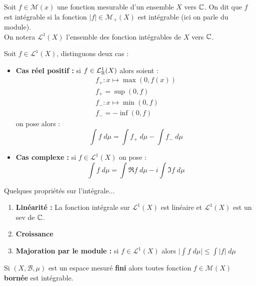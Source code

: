 \begin{definition}
    Soit $f \in \mathcal{M}(x)$ une fonction mesurable d'un ensemble $X$ vers $\mathbb{C}$. 
    On dit que $f$ est intégrable si la fonction $|f| \in \mathcal{M}_+(X)$ est intégrable (ici on parle du module). \\
    On notera $\mathcal{L}^1(X)$ l'ensemble des fonction intégrables de $X$ vers $\mathbb{C}$.
\end{definition}

\newpage
\begin{definition}
    Soit $f \in \mathcal{L}^1(X)$, distinguons deux cas :
    \begin{itemize}
        \item \textbf{Cas réel positif :} si $f \in \mathcal{L}^1_{\mathbb{R}}(X)$ alors soient :
            \begin{align*}
                f_+ : x \longmapsto \max (0, f(x)) \\ 
                f_+ = \sup (0, f) \\ 
                f_- : x \longmapsto \min (0, f) \\
                f_- = - \inf (0, f)
            \end{align*}
            on pose alors :
                \[ \int f \; d \mu = \int f_+ \; d \mu - \int f_- \; d \mu \] 
        \item \textbf{Cas complexe :} si $f \in \mathcal{L}^1(X)$ on pose :
            \[ \int f \; d \mu = \int \Re f \; d \mu - i \int \Im f \; d \mu \]
    \end{itemize}
\end{definition}

\begin{prop}
    Quelques propriétés sur l'intégrale...
    \begin{enumerate}
        \item \textbf{Linéarité :} La fonction intégrale sur $\mathcal{L}^1(X)$ est linéaire et $\mathcal{L}^1(X)$ est un sev de $\mathbb{C}$.
        \item \textbf{Croissance}
        \item \textbf{Majoration par le module :} si $f \in \mathcal{L}^1(X)$ alors $\Big| \int f \; d \mu \Big| \leq \int |f| \; d \mu$
    \end{enumerate}
\end{prop}

\begin{theorem}
    Si $(X,\mathcal{B},\mu)$ est un espace mesuré \textbf{fini} alors toutes fonction $ f \in \mathcal{M}(X)$ \textbf{bornée} est intégrable. 
\end{theorem}


